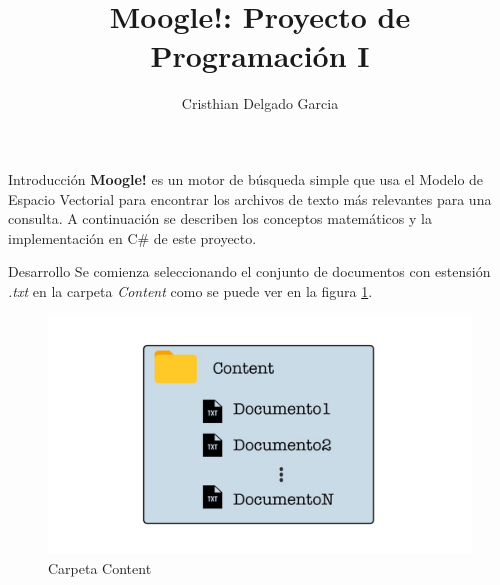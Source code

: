 \documentclass{beamer}
\title{Moogle!: Proyecto de Programación I}
\author{Cristhian Delgado Garcia}
\date{}
\begin{document}
\newcommand{\class}[1]{\textcolor{cyan_opaco}{\texttt{#1}}}
\newcommand{\keyword}[1]{\textcolor{blue_opaco}{\texttt{#1}}}
\begin{frame}
\maketitle
\end{frame}

\begin{frame}{Introducción}
    \textbf{Moogle!} es un motor de búsqueda simple que usa el Modelo de Espacio Vectorial para encontrar los archivos de texto más relevantes para una consulta. A continuación se describen los conceptos matemáticos y la implementación en C\# de este proyecto.

\end{frame}
\begin{frame}{Desarrollo}
Se comienza seleccionando el conjunto de documentos con estensión \textit{.txt} en la carpeta \textit{Content} como se puede ver en la figura \ref{fig:carpetacontent}.
\begin{figure}
    \centering
    \includegraphics[width=0.5\linewidth]{content.jpg}
    \caption{Carpeta Content}
    \label{fig:carpetacontent}
\end{figure}
\end{frame}
\end{document}
